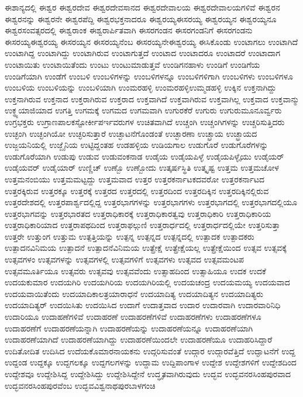 {ಈಶಾನ್ಯದಲ್ಲಿ
ಈಶ್ವರ
ಈಶ್ವರದೇವ
ಈಶ್ವರದೇವಸಾನದ
ಈಶ್ವರದೇವಾಲಯ
ಈಶ್ವರದೇವಾಲಯಗಳಿವೆ
ಈಶ್ವರನ
ಈಶ್ವರನನ್ನು
ಈಶ್ವರನೇ
ಈಶ್ವರಪೆದ್ದಿ
ಈಶ್ವರಭಕ್ತನಾದರೂ
ಈಶ್ವರಯ್ಯಈಸರಯ್ಯ
ಈಶ್ವರಯ್ಯನ
ಈಶ್ವರಯ್ಯನೂ
ಈಶ್ವರಸಂವತ್ಸರದಲ್ಲಿ
ಈಶ್ವರಾಂಕ
ಈಶ್ವರಾರ್ಪಿತವಾಗಿ
ಈಸರಗಂಡನ
ಈಸರಗಂಡನಿಗೆ
ಈಸರಗಂಡನು
ಈಸರಯ್ಯಈಶ್ವರಯ್ಯ
ಈಸರಯ್ಯನ
ಈಸರಯ್ಯನೆಂಬ
ಈಸರಯ್ಯನೇಈಶ್ವರಯ್ಯ
ಈಸಿಕೊಂಡು
ಉಂಟಾಗಲು
ಉಂಟಾಗಿದೆ
ಉಂಟಾಗಿದ್ದ
ಉಂಟಾಗಿದ್ದು
ಉಂಟಾಗಿರುವ
ಉಂಟಾಗುತ್ತದೆ
ಉಂಟಾದ
ಉಂಟಾದರೂ
ಉಂಟಾದರೆ
ಉಂಟಾದಾಗ
ಉಂಟಾಯಿತು
ಉಂಟಾಯಿತೆಂದು
ಉಂಟು
ಉಂಟುಮಾಡುತ್ತವೆ
ಉಂಡಿಗನಹಾಳು
ಉಂಡಿಗೆ
ಉಂಡಿಗೆಯ
ಉಂಡಿಗೆಯಾಗಿ
ಉಂಡೆಗೆ
ಉಂಬಳಿ
ಉಂಬಳಿಗಳನ್ನು
ಉಂಬಳಿಗಳನ್ನೂ
ಉಂಬಳಿಗಳಿಗಾಗಿ
ಉಂಬಳಿಗಳು
ಉಂಬಳಿಗಳೂ
ಉಂಬಳಿಯ
ಉಂಬಳಿಯನ್ನು
ಉಂಬಳಿಯಾಗಿ
ಉಂಮರಹಳ್ಳಿ
ಉಂಮರಹಳ್ಳಿಉಮ್ಮಡಹಳ್ಳಿ
ಉಕ್ಕಿನ
ಉಕ್ತನಾಗಿದ್ದು
ಉಕ್ತನಾಗಿರುವ
ಉಕ್ತನಾದ
ಉಕ್ತರಾಗಿರುವ
ಉಕ್ತರಾದ
ಉಕ್ತವಾಗಿದೆ
ಉಕ್ತವಾಗಿರುವ
ಉಕ್ತವಾಗಿಲ್ಲ
ಉಕ್ತವಾದ
ಉಕ್ತವಾನ್ಮು
ಉಕ್ಥ್ಯಯಾಜಿಯಾದ
ಉಗತ್ತಿ
ಉಗಮಕ್ಕೆ
ಉಗಮದ
ಉಗಮವಾಗಿ
ಉಗುರಕೆರೆ
ಉಗುರು
ಉಗುರುಮೂನೂರ್ವ್ವರು
ಉಗ್ರಭಕ್ತರು
ಉಗ್ರಾಣಪಾಲಕಸ್ಟೋರ್ಕೀಪರ್ಇವರುಗಳ
ಉಚಿತವಾಗಿದೆ
ಉಚ್ಚಂಗಿ
ಉಚ್ಚಂಗಿಗಳನ್ನು
ಉಚ್ಚರಿಸುತ್ತಿದರು
ಉಚ್ಛಂಗಿ
ಉಚ್ಛಂಗಿಯೋ
ಉಚ್ಛರಿಸುತ್ತಾರೆ
ಉಚ್ಛಾಟನೆಗೊಂಡಂತೆ
ಉಚ್ಛಾರಣಾ
ಉಚ್ಛ್ರಾಯ
ಉಚ್ಛ್ರಾಯದ
ಉಜ್ಜಯನಿಯಲ್ಲಿ
ಉಜ್ಜೈನಿಯ
ಉಟ್ಟಿದ್ದಂತಹ
ಉಡಹಳ್ಳಿಯ
ಉಡಿಯಗಾಲ
ಉಡುಗೊರೆ
ಉಡುಗೊರೆಗಳನ್ನು
ಉಡುಗೊರೆಯಾಗಿ
ಉಡುಪು
ಉಡುವ
ಉಡುವಂಕನಾಡ
ಉಡೈಯ
ಉಡೈಯಪಿಳ್ಳೆ
ಉಡೈಯಪಿಳ್ಳೈಯು
ಉಡೈಯರ್
ಉಡೈಯವರ್
ಉಡೈಯಾರ್
ಉಣ್ಣಿಚ್
ಉಣ್ಬೊ
ಉಣ್ಬೋದು
ಉತ್ಕರ್ಷಸ್ಥಿತಿ
ಉತ್ಕೃಷ್ಟ
ಉತ್ತಮ
ಉತ್ತಮಚೋಳ
ಉತ್ತಮನಂಬಿಯು
ಉತ್ತಮಮಟ್ಟದ್ದು
ಉತ್ತಮವಾದ
ಉತ್ತರ
ಉತ್ತರಕರ್ನಾಟಕದವರೋ
ಉತ್ತರಕರ್ನಾಟದ
ಉತ್ತರಕ್ಕಿರುವ
ಉತ್ತರಕ್ಕೂ
ಉತ್ತರಕ್ಕೆ
ಉತ್ತರದ
ಉತ್ತರದಲ್ಲಿ
ಉತ್ತರದಿಂದ
ಉತ್ತರದಿಕ್ಕಿನ
ಉತ್ತರದಿಕ್ಕಿನಲ್ಲಿರುವ
ಉತ್ತರದೇಶದಲ್ಲಿ
ಉತ್ತರಪಾರ್ಶ್ವದಲ್ಲಿದ್ದ
ಉತ್ತರಭಾಗಗಳನ್ನು
ಉತ್ತರಭಾಗಗಳು
ಉತ್ತರಭಾಗದಲ್ಲಿ
ಉತ್ತರಭಾಗದಲ್ಲಿಯೂ
ಉತ್ತರಭಾಗವನ್ನು
ಉತ್ತರಭಾರತದ
ಉತ್ತರಾಧಿಕಾರಕ್ಕೆ
ಉತ್ತರಾಧಿಕಾರತ್ವವು
ಉತ್ತರಾಧಿಕಾರಿ
ಉತ್ತರಾಧಿಕಾರಿಯ
ಉತ್ತರಾಧಿಕಾರಿಯಾದ
ಉತ್ತರಾಪಥದಿಂದ
ಉತ್ತರಾಫಲ್ಗುಣಿ
ಉತ್ತರಾರ್ಧದಲ್ಲಿ
ಉತ್ತರಾರ್ಧದಲ್ಲಿಯೇ
ಉತ್ತರಿಸುತ್ತಾ
ಉತ್ತರೇ
ಉತ್ತುಂಗ
ಉತ್ತುಮ
ಉತ್ಪತ್ತಿಯನ್ನು
ಉತ್ಪನ್ನ
ಉತ್ಪನ್ನದ
ಉತ್ಪನ್ನದಲ್ಲಿ
ಉತ್ಪಾದಕ
ಉತ್ಪಾದಕರು
ಉತ್ಪಾದನವಿನಿಮಯ
ಉತ್ಪಾದನೆ
ಉತ್ಪಾದನೆವಿನಿಮಯ
ಉತ್ಪ್ರೇಕ್ಷೆ
ಉತ್ಪ್ರೇಕ್ಷೆಯಲ್ಲ
ಉತ್ಪ್ರೇಕ್ಷೆಯಿಂದ
ಉತ್ಸವ
ಉತ್ಸವಕ್ಕೆ
ಉತ್ಸವಗಳಂ
ಉತ್ಸವಗಳನ್ನು
ಉತ್ಸವಗಳಲ್ಲಿ
ಉತ್ಸವಗಳಿಗೆ
ಉತ್ಸವಗಳು
ಉತ್ಸವದ
ಉತ್ಸವಮಂಟಪ
ಉತ್ಸವಮೂರ್ತಿಯೂ
ಉತ್ಸವರು
ಉತ್ಸವವು
ಉತ್ಸವವೆಂದು
ಉತ್ಸಾಹದಿಂದ
ಉತ್ಸಾಹಿಯೂ
ಉದಕ
ಉದಕೆ
ಉದಯಕುಮಾರ
ಉದಯಗಿರಿ
ಉದಯಗಿರಿಯ
ಉದಯಗಿರಿಯಲ್ಲಿ
ಉದಯಚಂದ್ರ
ಉದಯಮಯ್ಯ
ಉದಯವಾದ
ಉದಯವಾಯಿತೆಂದು
ಉದಯಾದಿಕಾಲತ್ರಯಾರಾಧನೆ
ಉದಯಾದಿತ್ಯ
ಉದಯಾದಿತ್ಯನ
ಉದಯಾದಿತ್ಯರು
ಉದಯಾದಿತ್ಯರ್
ಉದಯಿಸಿತು
ಉದಯಿಸಿದ
ಉದಾಗೆ
ಉದಾತ್ತವಾದ
ಉದಾರ
ಉದಾರವಾಗಿ
ಉದಾರವಾರಿನಿಧಿ
ಉದಾರಿಯೂ
ಉದಾಹಣೆಗಳಿವೆ
ಉದಾಹರಣೆ
ಉದಾಹರಣೆಗಳಿವೆ
ಉದಾಹರಣೆಗಳು
ಉದಾಹರಣೆಗಳೂ
ಉದಾಹರಣೆಗೆ
ಉದಾಹರಣೆಯನ್ನಾಗಿ
ಉದಾಹರಣೆಯನ್ನು
ಉದಾಹರಣೆಯನ್ನೂ
ಉದಾಹರಣೆಯಾಗಿ
ಉದಾಹರಣೆಯಾಗಿದೆ
ಉದಾಹರಣೆಯಾಗಿದ್ದು
ಉದಾಹರಣೆಯಿಂದಲೇ
ಉದಾಹರಣೆಯೂ
ಉದಾಹರಿಸಿದ್ದಾರೆ
ಉದಿತೋದಿತ
ಉದಿಸಿದ
ಉದೆಯಕೊಮಾರನಾಯಕನು
ಉದ್ಗರಿಸುವಂತೆ
ಉದ್ಗಾರ
ಉದ್ಗಾರವೆತ್ತಿದೆ
ಉದ್ಘಾಟನೆಗೆ
ಉದ್ದ
ಉದ್ದಂಡ
ಉದ್ದಕ್ಕೂ
ಉದ್ದಗಲಕ್ಕೂ
ಉದ್ದಗಲಗಳನ್ನು
ಉದ್ದಾಮ
ಉದ್ದಿಪಾಂಗಾಳ
ಉದ್ದೇಶ
ಉದ್ದೇಶಗಳಿಗೆ
ಉದ್ದೇಶದಿಂದ
ಉದ್ದೇಶವೂ
ಉದ್ದೇಶಿಸಿದ್ದ
ಉದ್ದೇಶಿಸಿದ್ದು
ಉದ್ದೇಶಿಸಿದ್ದೇನೆ
ಉದ್ಧೃತವಾಗಿರುವುದು
ಉದ್ಭವ
ಉದ್ಭವನರಸಿಂಹಪುರವಾದ
ಉದ್ಭವನರಸಿಂಹಪುರವೆಂಬ
ಉದ್ಭವವಿಶ್ವನಾಥಪುರಬಾಳಗಂಚಿ
}
